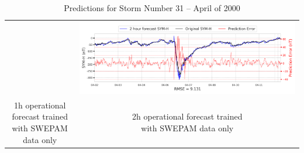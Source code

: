 \documentclass[draft,sw]{agutexSI2019}
\begin{document}
\begin{table}
\begin{tabular}{cc}
&
\includegraphics[width=0.49\linewidth]{paper_plots_shade/2h_swepam_rt/2h_swepam_rt_storm_31.png}
\\
\shortstack{1h operational forecast trained\\ with SWEPAM data only} & \shortstack{2h operational forecast trained\\ with SWEPAM data only}
\vspace*{12pt}
\\
\end{tabular}
\caption{Predictions for Storm Number 31 -- April of 2000}
\label{storm-31}
\end{table}
\end{document}
